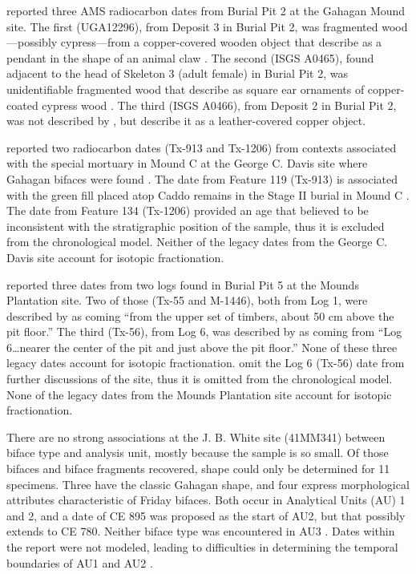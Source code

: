 \documentclass[review]{elsarticle}
\begin{document}
\citet[Table 1]{RN4783} reported three AMS radiocarbon dates from Burial Pit 2 at the Gahagan Mound site. The first (UGA12296), from Deposit 3 in Burial Pit 2, was fragmented wood—possibly cypress—from a copper-covered wooden object that \citet[99, Plate 29, No. 2, Object 5]{RN5274} describe as a pendant in the shape of an animal claw \citep{RN4783}. The second (ISGS A0465), found adjacent to the head of Skeleton 3 (adult female) in Burial Pit 2, was unidentifiable fragmented wood that \citet[96, Plate 21 and 28, Nos. 2-3]{RN5274} describe as square ear ornaments of copper-coated cypress wood \citep{RN4783}. The third (ISGS A0466), from Deposit 2 in Burial Pit 2, was not described by \citet[96]{RN5274}, but \citet[62]{RN4783} describe it as a leather-covered copper object.

\citet[Table 1]{RN3714} reported two radiocarbon dates (Tx-913 and Tx-1206) from contexts associated with the special mortuary in Mound C at the George C. Davis site where Gahagan bifaces were found \citep[Table 5]{RN3714}. The date from Feature 119 (Tx-913) is associated with the green fill placed atop Caddo remains in the Stage II burial in Mound C \citep{RN3714}. The date from Feature 134 (Tx-1206) provided an age that \citet{RN3714} believed to be inconsistent with the stratigraphic position of the sample, thus it is excluded from the chronological model. Neither of the legacy dates from the George C. Davis site account for isotopic fractionation.

\citet[72]{RN11561} reported three dates from two logs found in Burial Pit 5 at the Mounds Plantation site. Two of those (Tx-55 and M-1446), both from Log 1, were described by \citet[72]{RN11561} as coming “from the upper set of timbers, about 50 cm above the pit floor.” The third (Tx-56), from Log 6, was described by \citet[72]{RN11561} as coming from “Log 6…nearer the center of the pit and just above the pit floor.” None of these three legacy dates account for isotopic fractionation. \citet{RN11561} omit the Log 6 (Tx-56) date from further discussions of the site, thus it is omitted from the chronological model. None of the legacy dates from the Mounds Plantation site account for isotopic fractionation.

There are no strong associations at the J. B. White site (41MM341) between biface type and analysis unit, mostly because the sample is so small. Of those bifaces and biface fragments recovered, shape could only be determined for 11 specimens. Three have the classic Gahagan shape, and four express morphological attributes characteristic of Friday bifaces. Both occur in Analytical Units (AU) 1 and 2, and a date of CE 895 was proposed as the start of AU2, but that possibly extends to CE 780. Neither biface type was encountered in AU3 \cite[139]{RN11565}. Dates within the report were not modeled, leading to difficulties in determining the temporal boundaries of AU1 and AU2 \cite[136]{RN11565}.
\end{document}
